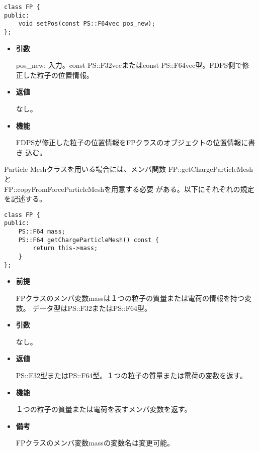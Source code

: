 \begin{screen}
\begin{verbatim}
class FP {
public:
    void setPos(const PS::F64vec pos_new);
};
\end{verbatim}
\end{screen}

\begin{itemize}

\item {\bf 引数}

  pos\_new: 入力。const PS::F32vecまたはconst PS::F64vec型。FDPS側で修
  正した粒子の位置情報。

\item {\bf 返値}

  なし。
  
\item {\bf 機能}

  FDPSが修正した粒子の位置情報をFPクラスのオブジェクトの位置情報に書き
  込む。

\end{itemize}


Particle Meshクラスを用いる場合には、メンバ関数
FP::getChargeParticleMeshと\\FP::copyFromForceParticleMeshを用意する必要
がある。以下にそれぞれの規定を記述する。


\begin{screen}
\begin{verbatim}
class FP {
public:
    PS::F64 mass;
    PS::F64 getChargeParticleMesh() const {
        return this->mass;
    }
};
\end{verbatim}
\end{screen}

\begin{itemize}

\item {\bf 前提}

  FPクラスのメンバ変数massは１つの粒子の質量または電荷の情報を持つ変数。
  データ型はPS::F32またはPS::F64型。

\item {\bf 引数}

  なし。

\item {\bf 返値}

  PS::F32型またはPS::F64型。１つの粒子の質量または電荷の変数を返す。
  
\item {\bf 機能}

  １つの粒子の質量または電荷を表すメンバ変数を返す。

\item {\bf 備考}

  FPクラスのメンバ変数massの変数名は変更可能。

\end{itemize}
\fi

